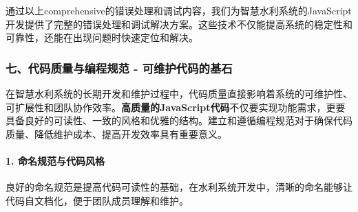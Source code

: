 \begin{Shaded}
\begin{Highlighting}[]
        \NormalTok{(}\OperatorTok{,}\OperatorTok{,}\OperatorTok{;}
        
        \OperatorTok{;}
        
\NormalTok{    \} }
        \OperatorTok{,}\OperatorTok{,}\OperatorTok{;}
        \OperatorTok{;}
\NormalTok{    \} }\NormalTok{ \{}
        \NormalTok{(}\NormalTok{)}\OperatorTok{;}
\NormalTok{    \}}
\NormalTok{\}}
\end{Highlighting}
\end{Shaded}

通过以上comprehensive的错误处理和调试内容，我们为智慧水利系统的JavaScript开发提供了完整的错误处理和调试解决方案。这些技术不仅能提高系统的稳定性和可靠性，还能在出现问题时快速定位和解决。

\subsubsection{七、代码质量与编程规范 - 可维护代码的基石}\label{ux4e03ux4ee3ux7801ux8d28ux91cfux4e0eux7f16ux7a0bux89c4ux8303---ux53efux7ef4ux62a4ux4ee3ux7801ux7684ux57faux77f3}

在智慧水利系统的长期开发和维护过程中，代码质量直接影响着系统的可维护性、可扩展性和团队协作效率。\textbf{高质量的JavaScript代码}不仅要实现功能需求，更要具备良好的可读性、一致的风格和优雅的结构。建立和遵循编程规范对于确保代码质量、降低维护成本、提高开发效率具有重要意义。

\paragraph{1. 命名规范与代码风格}\label{ux547dux540dux89c4ux8303ux4e0eux4ee3ux7801ux98ceux683c}

良好的命名规范是提高代码可读性的基础，在水利系统开发中，清晰的命名能够让代码自文档化，便于团队成员理解和维护。

